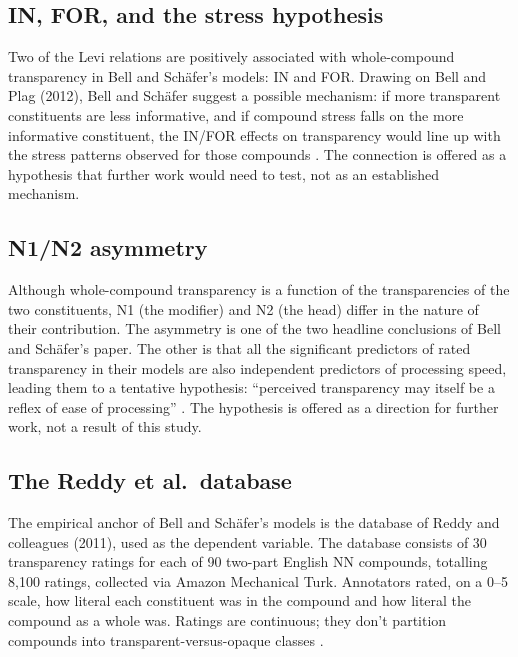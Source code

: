\subsection{IN, FOR, and the stress hypothesis}\label{sec:B-3}

Two of the Levi relations are positively associated with whole-compound transparency in Bell and Schäfer's models: IN and FOR. Drawing on Bell and Plag (2012), Bell and Schäfer suggest a possible mechanism: if more transparent constituents are less informative, and if compound stress falls on the more informative constituent, the IN/FOR effects on transparency would line up with the stress patterns observed for those compounds \autocite[168]{bell-schafer-2016-modelling-transparency}. The connection is offered as a hypothesis that further work would need to test, not as an established mechanism.

\subsection{\textup{N1}/\textup{N2} asymmetry}\label{sec:B-4}

Although whole-compound transparency is a function of the transparencies of the two constituents, \textup{N1} (the modifier) and \textup{N2} (the head) differ in the nature of their contribution. The asymmetry is one of the two headline conclusions of Bell and Schäfer's paper. The other is that all the significant predictors of rated transparency in their models are also independent predictors of processing speed, leading them to a tentative hypothesis: \enquote{perceived transparency may itself be a reflex of ease of processing} \autocite[157, abstract]{bell-schafer-2016-modelling-transparency}. The hypothesis is offered as a direction for further work, not a result of this study.

\subsection{The Reddy et al.~database}\label{sec:B-5}

The empirical anchor of Bell and Schäfer's models is the database of Reddy and colleagues (2011), used as the dependent variable. The database consists of 30 transparency ratings for each of 90 two-part English NN compounds, totalling 8,100 ratings, collected via Amazon Mechanical Turk. Annotators rated, on a 0--5 scale, how literal each constituent was in the compound and how literal the compound as a whole was. Ratings are continuous; they don't partition compounds into transparent-versus-opaque classes \autocite[164]{bell-schafer-2016-modelling-transparency}.
